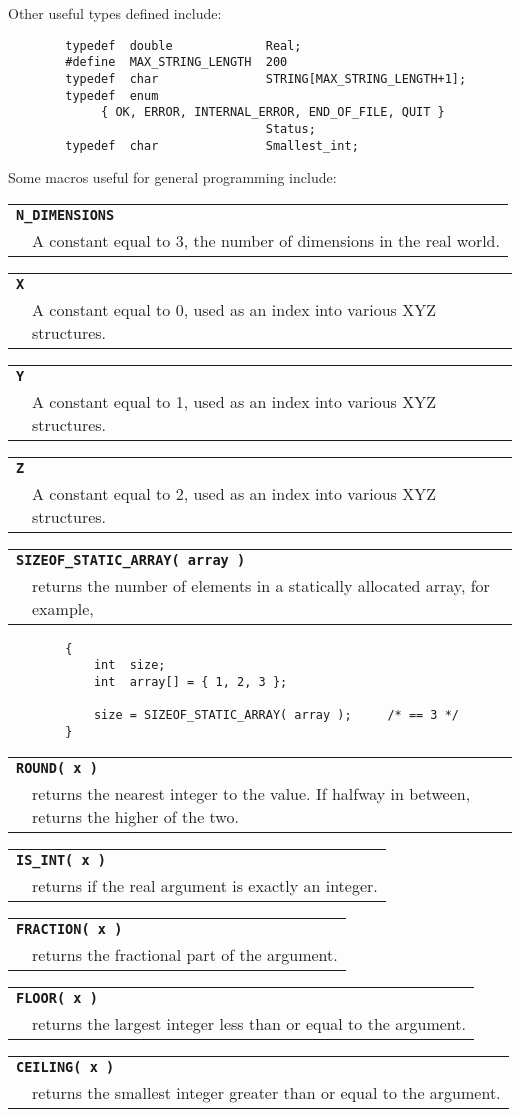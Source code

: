Other useful types defined include:
{\bf\begin{verbatim}
        typedef  double             Real;
        #define  MAX_STRING_LENGTH  200
        typedef  char               STRING[MAX_STRING_LENGTH+1];
        typedef  enum 
             { OK, ERROR, INTERNAL_ERROR, END_OF_FILE, QUIT }
                                    Status;
        typedef  char               Smallest_int;
\end{verbatim}}

\newcommand{\definemacro}[2]{
\begin{flushleft}
\begin{tabular}{p{2cm}p{10cm}}
\multicolumn{2}{l}{{\bf\tt #1}} \\
& #2 \\
\end{tabular}\end{flushleft}}

Some macros useful for general programming include:

\definemacro{N\_DIMENSIONS}{A constant equal to 3, the number of
dimensions in the real world.}

\definemacro{X}{A constant equal to 0, used as an index into
various XYZ structures.}

\definemacro{Y}{A constant equal to 1, used as an index into
various XYZ structures.}

\definemacro{Z}{A constant equal to 2, used as an index into
various XYZ structures.}

\definemacro{SIZEOF\_STATIC\_ARRAY( array )}
{returns the number of elements in a statically allocated array, for example,}
{\bf\begin{verbatim}
        {
            int  size;
            int  array[] = { 1, 2, 3 };

            size = SIZEOF_STATIC_ARRAY( array );     /* == 3 */
        }
\end{verbatim}}

\definemacro{ROUND( x )}{returns the nearest integer to the value.  If
halfway in between, returns the higher of the two.}

\definemacro{IS\_INT( x )}{returns \name{TRUE} if the real argument is exactly an integer.}

\definemacro{FRACTION( x )}{returns the fractional part of the argument.}

\definemacro{FLOOR( x )}{returns the largest integer less than or
equal to the argument.}

\definemacro{CEILING( x )}{returns the smallest integer greater than or
equal to the argument.}

